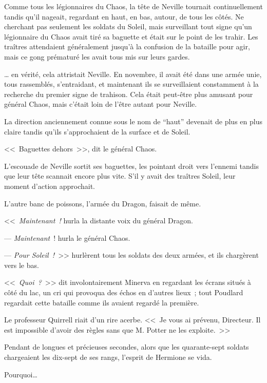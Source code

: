 Comme tous les légionnaires du Chaos, la tête de Neville tournait continuellement tandis qu'il nageait, regardant en haut, en bas, autour, de tous les côtés. Ne cherchant pas seulement les soldats du Soleil, mais surveillant tout signe qu'un légionnaire du Chaos avait tiré sa baguette et était sur le point de les trahir. Les traîtres attendaient généralement jusqu'à la confusion de la bataille pour agir, mais ce gong prématuré les avait tous mis sur leurs gardes.

… en vérité, cela attristait Neville. En novembre, il avait été dans une armée unie, tous rassemblés, s'entraidant, et maintenant ils se surveillaient constamment à la recherche du premier signe de trahison. Cela était peut-être plus amusant pour général Chaos, mais c'était loin de l'être autant pour Neville.

La direction anciennement connue sous le nom de “haut” devenait de plus en plus claire tandis qu'ils s'approchaient de la surface et de Soleil.

<<~Baguettes dehors~>>, dit le général Chaos.

L'escouade de Neville sortit ses baguettes, les pointant droit vers l'ennemi tandis que leur tête scannait encore plus vite. S'il y avait des traîtres Soleil, leur moment d'action approchait.

L'autre banc de poissons, l'armée du Dragon, faisait de même.

<<~\emph{Maintenant~!} hurla la distante voix du général Dragon.

--- \emph{Maintenant}~! hurla le général Chaos.

--- \emph{Pour Soleil~!}~>> hurlèrent tous les soldats des deux armées, et ils chargèrent vers le bas.

\later

<<~\emph{Quoi~?}~>> dit involontairement Minerva en regardant les écrans situés à côté du lac, un cri qui provoqua des échos en d'autres lieux~; tout Poudlard regardait cette bataille comme ils avaient regardé la première.

Le professeur Quirrell riait d'un rire acerbe. <<~Je vous ai prévenu, Directeur. Il est impossible d'avoir des règles sans que M. Potter ne les exploite.~>>

\later

Pendant de longues et précieuses secondes, alors que les quarante-sept soldats chargeaient les dix-sept de ses rangs, l'esprit de Hermione se vida.

Pourquoi…

